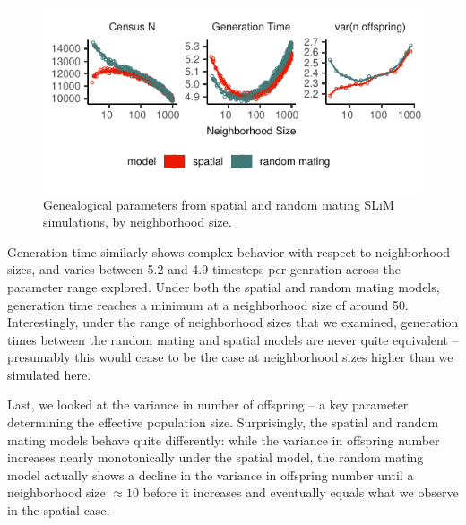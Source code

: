 \documentclass[11pt,twoside,lineno]{preprint}
\begin{document}
\begin{figure}[htbp]
\centering
\includegraphics{figures/pop_params.pdf}
\caption{Genealogical parameters from spatial and random mating SLiM simulations, by neighborhood size.}
\label{fig:genparams}
\end{figure}


Generation time similarly shows complex behavior with respect to neighborhood sizes, and varies between 5.2 and 4.9 timesteps per genration across the parameter range explored. 
Under both the spatial and random mating models, 
generation time reaches a minimum at a neighborhood size of around 50. 
Interestingly, under the range of neighborhood sizes that we examined, generation times between the random mating and spatial models are never quite equivalent -- presumably this would cease to be the case at neighborhood sizes higher than we simulated here.

Last, we looked at the variance in number of offspring -- a key parameter determining the effective population size. 
Surprisingly, the spatial and random mating models behave quite differently: 
while the variance in offspring number increases nearly monotonically under the spatial model, the random mating model actually shows a decline in the variance in offspring number until a neighborhood size $\approx 10$ before it increases and eventually equals what we observe in the spatial case. 

\end{document}
